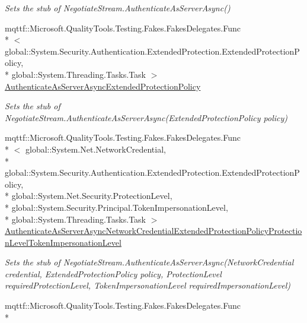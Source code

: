 \begin{DoxyCompactItemize}
\begin{DoxyCompactList}\small\item\em Sets the stub of Negotiate\-Stream.\-Authenticate\-As\-Server\-Async()\end{DoxyCompactList}\item 
mqttf\-::\-Microsoft.\-Quality\-Tools.\-Testing.\-Fakes.\-Fakes\-Delegates.\-Func\\*
$<$ global\-::\-System.\-Security.\-Authentication.\-Extended\-Protection.\-Extended\-Protection\-Policy, \\*
global\-::\-System.\-Threading.\-Tasks.\-Task $>$ \hyperlink{class_system_1_1_net_1_1_security_1_1_fakes_1_1_stub_negotiate_stream_a7eab91359dfab820d3248af4ce890731}{Authenticate\-As\-Server\-Async\-Extended\-Protection\-Policy}
\begin{DoxyCompactList}\small\item\em Sets the stub of Negotiate\-Stream.\-Authenticate\-As\-Server\-Async(\-Extended\-Protection\-Policy policy)\end{DoxyCompactList}\item 
mqttf\-::\-Microsoft.\-Quality\-Tools.\-Testing.\-Fakes.\-Fakes\-Delegates.\-Func\\*
$<$ global\-::\-System.\-Net.\-Network\-Credential, \\*
global\-::\-System.\-Security.\-Authentication.\-Extended\-Protection.\-Extended\-Protection\-Policy, \\*
global\-::\-System.\-Net.\-Security.\-Protection\-Level, \\*
global\-::\-System.\-Security.\-Principal.\-Token\-Impersonation\-Level, \\*
global\-::\-System.\-Threading.\-Tasks.\-Task $>$ \hyperlink{class_system_1_1_net_1_1_security_1_1_fakes_1_1_stub_negotiate_stream_adff4c08f77b073885df2675dee424844}{Authenticate\-As\-Server\-Async\-Network\-Credential\-Extended\-Protection\-Policy\-Protection\-Level\-Token\-Impersonation\-Level}
\begin{DoxyCompactList}\small\item\em Sets the stub of Negotiate\-Stream.\-Authenticate\-As\-Server\-Async(\-Network\-Credential credential, Extended\-Protection\-Policy policy, Protection\-Level required\-Protection\-Level, Token\-Impersonation\-Level required\-Impersonation\-Level)\end{DoxyCompactList}\item 
mqttf\-::\-Microsoft.\-Quality\-Tools.\-Testing.\-Fakes.\-Fakes\-Delegates.\-Func\\*

\end{DoxyCompactItemize}
